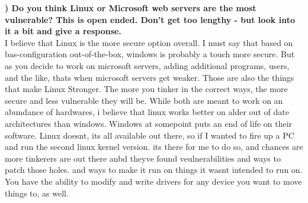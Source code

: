 \documentclass{report}
\newcommand{\mysubsection}[2]{\textbf{\romannumeral #1) #2}}
\begin{document}
\noindent\mysubsection{14}{Do you think Linux or Microsoft web servers are the most vulnerable?  This is open ended.  Don't get too lengthy - but look into it a bit and give a response.  }
\\I believe that Linux is the more secure option overall. I must say that based
on bas-configuration out-of-the-box, windows is probably a touch more secure.
But as you decide to work on microsoft servers, adding additional programs,
users, and the like, thats when microsoft servers get weaker.
Those are also the things that make Linux Stronger. The more you tinker in the
correct ways, the more secure and less vulnerable they will be.
While both are meant to work on an abundance of hardwares, i believe that linux
works better on alder out of date architectures than windows. Windows at
somepoint puts an end of life on their software. Linux doesnt, its all
available out there, so if I wanted to fire up a PC and run the second linux
kernel version. its there for me to do so, and chances are more tinkerers are
out there anbd theyve found veulnerabilities and ways to patch those holes. and
ways to make it run on things it wasnt intended to run on. You have the ability
to modify and write drivers for any device you want to move things to, as well.


\end{document}
